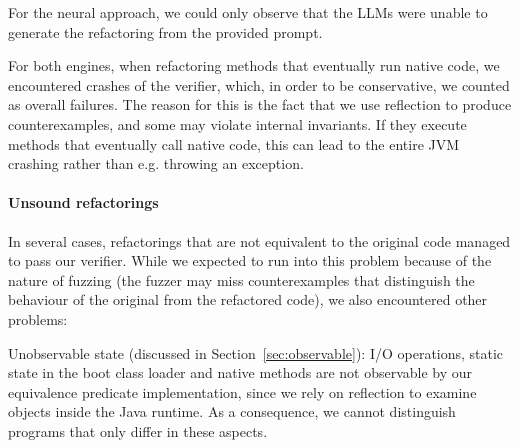 \documentclass[sigconf,review,anonymous]{acmart}
\begin{document}
For the neural approach, we could only observe that the LLMs were unable to generate the refactoring from the provided prompt.

For both engines, when refactoring methods that eventually run native code, we encountered crashes of the verifier, which, in order to be conservative, we counted as overall failures.
The reason for this is the fact that we use reflection to produce counterexamples,
and some may violate internal invariants.
If they execute methods that eventually call native code, this can lead to the entire JVM
crashing rather than e.g. throwing an exception. %


\paragraph{Unsound refactorings}
%
%
In several cases, refactorings that are not equivalent to the original code managed to pass our verifier.
While we expected to run into this problem because of the nature of fuzzing (the fuzzer may miss counterexamples that distinguish the behaviour of the original from the refactored code),
we also encountered other problems:


Unobservable state (discussed in Section~\ref{sec:observable}): I/O operations, static state in the boot class loader and
native methods are not observable by our equivalence predicate implementation,
since we rely on reflection to examine objects inside the Java runtime. As
a consequence, we cannot distinguish programs that only differ in these aspects.
\end{document}
